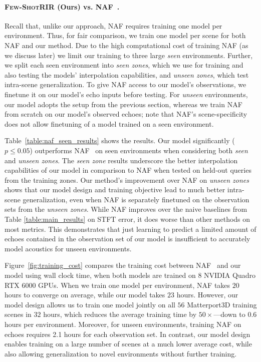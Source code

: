 \paragraph{\textsc{Few-ShotRIR}  (Ours) vs. NAF~\citep{luo2022learning}.}  Recall that, unlike our approach, NAF requires training one model per environment.  Thus, for fair comparison, we train one model per scene for both NAF and our method. Due to the high computational cost of training NAF (as we discuss later) we limit our training to three large \emph{seen} environments. Further, we split each seen environment into \emph{seen zones}, which we use for training and also testing the models' interpolation capabilities, and \emph{unseen zones}, which test intra-scene generalization. To give NAF access to our model's observations, we finetune it on our model's echo inputs before testing. For \emph{unseen} environments, our model  adopts the setup from the previous section, whereas we train NAF from scratch  on our model's observed echoes; note that NAF's scene-specificity does not allow finetuning of a model trained on a seen environment. 

Table~\ref{table:naf_seen_results} shows the results. Our model significantly ($p \leq 0.05$) outperforms NAF~\citep{luo2022learning}  on seen environments when considering both \emph{seen} and \emph{unseen zones}. The \emph{seen zone} results underscore the better interpolation capabilities of our model in comparison to NAF when tested on held-out queries from the training zones. Our method's improvement over NAF on \emph{unseen zones} shows that our model design and training objective lead to much better intra-scene generalization, even when NAF is separately finetuned on the observation sets from the \emph{unseen zones}. While NAF improves over the naive baselines from Table \ref{table:main_results} on STFT error, it does worse than other methods on most metrics. This demonstrates that just learning to predict a limited amount of echoes contained in the observation set of our model is insufficient to accurately model acoustics for unseen environments. 

Figure~\ref{fig:training_cost} compares the training cost between NAF~\citep{luo2022learning} and our model using wall clock time, when both models are trained on 8 NVIDIA Quadro RTX 6000 GPUs. When we train one model per environment, NAF takes $20$ hours to converge on average, while our model takes $23$ hours. However, our model design allows us to train one model jointly on all $56$ Matterport3D training scenes in $32$ hours, which reduces the average training time by $50\times$---down to $0.6$ hours per environment. Moreover, for unseen environments, training NAF on echoes requires 2.1 hours for each observation set. In contrast, our model design enables training on a large number of scenes at a much lower average cost, while also allowing generalization to novel environments without further training. 

